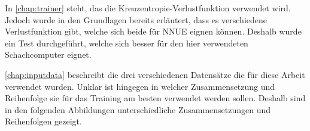 



In \autoref{chap:trainer} steht, das die Kreuzentropie-Verlustfunktion verwendet wird. Jedoch wurde in den Grundlagen bereits erläutert, dass es verschiedene Verlustfunktion gibt, welche sich beide für \ac{NNUE} eignen können. Deshalb wurde ein Test durchgeführt, welche sich besser für den hier verwendeten Schachcomputer eignet.

\autoref{chap:inputdata} beschreibt die drei verschiedenen Datensätze die für diese Arbeit verwendet wurden. Unklar ist hingegen in welcher Zusammensetzung und Reihenfolge sie für das Training am besten verwendet werden sollen. Deshalb sind in den folgenden Abbildungen unterschiedliche Zusammensetzungen und Reihenfolgen gezeigt.
